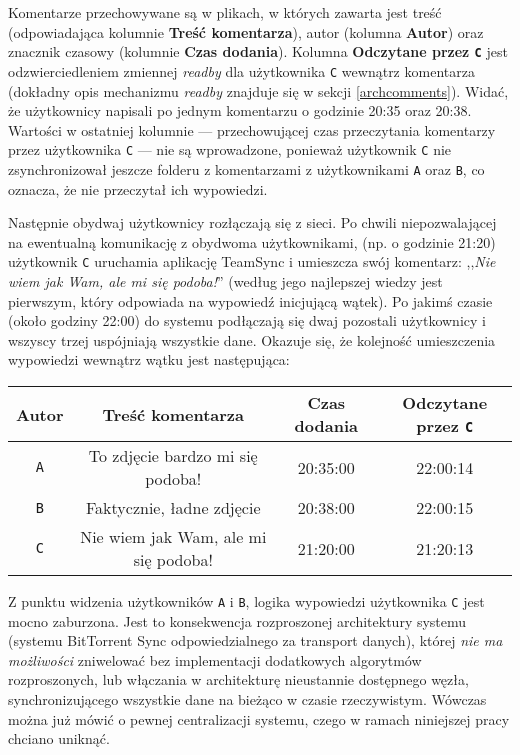 Komentarze przechowywane są w plikach, w których zawarta jest treść (odpowiadająca kolumnie \textbf{Treść komentarza}), autor (kolumna \textbf{Autor}) oraz znacznik czasowy (kolumnie \textbf{Czas dodania}). Kolumna \textbf{Odczytane przez \texttt{C}} jest odzwierciedleniem zmiennej \emph{readby} dla użytkownika \texttt{C} wewnątrz komentarza (dokładny opis mechanizmu \emph{readby} znajduje się w sekcji \ref{archcomments}). Widać, że użytkownicy napisali po jednym komentarzu o godzinie 20:35 oraz 20:38. Wartości w ostatniej kolumnie --- przechowującej czas przeczytania komentarzy przez użytkownika \texttt{C} --- nie są wprowadzone, ponieważ użytkownik \texttt{C} nie zsynchronizował jeszcze folderu z komentarzami z użytkownikami \texttt{A} oraz \texttt{B}, co oznacza, że nie przeczytał ich wypowiedzi.

Następnie obydwaj użytkownicy rozłączają się z sieci. Po chwili niepozwalającej na ewentualną komunikację z obydwoma użytkownikami, (np. o godzinie 21:20) użytkownik \texttt{C} uruchamia aplikację TeamSync i umieszcza swój komentarz: ,,\emph{Nie wiem jak Wam, ale mi się podoba!}'' (według jego najlepszej wiedzy jest pierwszym, który odpowiada na wypowiedź inicjującą wątek). Po jakimś czasie (około godziny 22:00) do systemu podłączają się dwaj pozostali użytkownicy i wszyscy trzej uspójniają wszystkie dane. Okazuje się, że kolejność umieszczenia wypowiedzi wewnątrz wątku jest następująca:

\vspace{5px}
\begin{center}
\begin{tabular}{c | c | c | c}
 \textbf{Autor} & \textbf{Treść komentarza} & \textbf{Czas dodania} & \textbf{Odczytane przez \texttt{C}}\\
 \hline
 \texttt{A} & To zdjęcie bardzo mi się podoba! & 20:35:00 & 22:00:14 \\
 \texttt{B} & Faktycznie, ładne zdjęcie & 20:38:00 & 22:00:15 \\
 \texttt{C} & Nie wiem jak Wam, ale mi się podoba! & 21:20:00 & 21:20:13
\end{tabular}
\end{center}
\vspace{5px}

Z punktu widzenia użytkowników \texttt{A} i \texttt{B}, logika wypowiedzi użytkownika \texttt{C} jest mocno zaburzona. Jest to konsekwencja rozproszonej architektury systemu (systemu BitTorrent Sync odpowiedzialnego za transport danych), której \emph{nie ma możliwości} zniwelować bez implementacji dodatkowych algorytmów rozproszonych, lub włączania w architekturę nieustannie dostępnego węzła, synchronizującego wszystkie dane na bieżąco w czasie rzeczywistym. Wówczas można już mówić o pewnej centralizacji systemu, czego w ramach niniejszej pracy chciano uniknąć.

